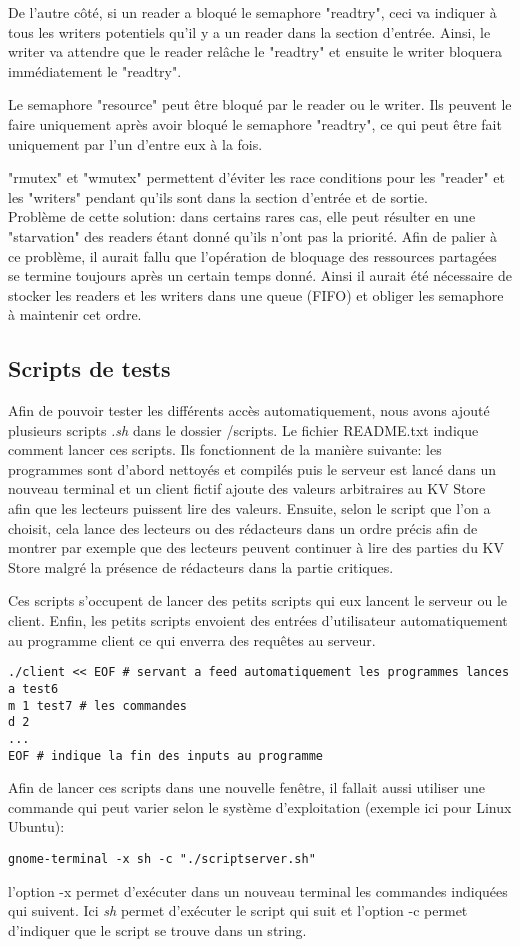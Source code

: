 \documentclass[11pt,a4paper]{article}
\begin{document}
De l'autre côté, si un reader a bloqué le semaphore "readtry", ceci va indiquer à tous les writers potentiels qu'il y a un reader dans la section d'entrée. Ainsi, le writer va attendre que le reader relâche le "readtry" et ensuite le writer bloquera immédiatement le "readtry".

Le semaphore "resource" peut être bloqué par le reader ou le writer. Ils peuvent le faire uniquement après avoir bloqué le semaphore "readtry", ce qui peut être fait uniquement par l'un d'entre eux à la fois.

"rmutex" et "wmutex" permettent d'éviter les race conditions pour les "reader" et les "writers" pendant qu'ils sont dans la section d'entrée et de sortie.\\
Problème de cette solution: dans certains rares cas, elle peut résulter en une "starvation" des readers étant donné qu'ils n'ont pas la priorité. Afin de palier à ce problème, il aurait fallu que l'opération de bloquage des ressources partagées se termine toujours après un certain temps donné. Ainsi il aurait été nécessaire de stocker les readers et les writers dans une queue (FIFO) et obliger les semaphore à maintenir cet ordre.
\subsection{Scripts de tests}
Afin de pouvoir tester les différents accès automatiquement, nous avons ajouté plusieurs scripts \textit{.sh} dans le dossier /scripts. Le fichier README.txt indique comment lancer ces scripts. Ils fonctionnent de la manière suivante: les programmes sont d'abord nettoyés et compilés puis le serveur est lancé dans un nouveau terminal et un client fictif ajoute des valeurs arbitraires au KV Store afin que les lecteurs puissent lire des valeurs. Ensuite, selon le script que l'on a choisit, cela lance des lecteurs ou des rédacteurs dans un ordre précis afin de montrer par exemple que des lecteurs peuvent continuer à lire des parties du KV Store malgré la présence de rédacteurs dans la partie critiques. 

Ces scripts s'occupent de lancer des petits scripts qui eux lancent le serveur ou le client. Enfin, les petits scripts envoient des entrées d'utilisateur automatiquement au programme client ce qui enverra des requêtes au serveur. 
\begin{lstlisting}
./client << EOF # servant a feed automatiquement les programmes lances
a test6
m 1 test7 # les commandes 
d 2
...
EOF # indique la fin des inputs au programme
\end{lstlisting}
Afin de lancer ces scripts dans une nouvelle fenêtre, il fallait aussi utiliser une commande qui peut varier selon le système d'exploitation (exemple ici pour Linux Ubuntu):
\begin{lstlisting}
gnome-terminal -x sh -c "./scriptserver.sh" 
\end{lstlisting}
l'option -x permet d'exécuter dans un nouveau terminal les commandes indiquées qui suivent. Ici \textit{sh} permet d'exécuter le script qui suit et l'option -c permet d'indiquer que le script se trouve dans un string.
\end{document}
